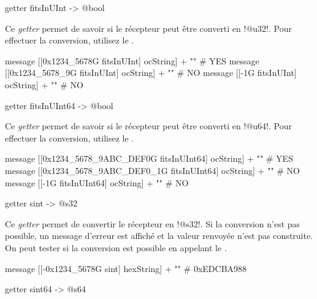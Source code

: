 
\begin{galgas4box}
getter fitsInUInt -> @bool
\end{galgas4box}

Ce \emph{getter} permet de savoir si le récepteur peut être converti en \ggsq!@u32!. Pour effectuer la conversion, utilisez le .

\begin{galgas4}
message [[0x1234_5678G fitsInUInt] ocString] + "\n" # YES
message [[0x1234_5678_9G fitsInUInt] ocString] + "\n" # NO
message [[-1G fitsInUInt] ocString] + "\n" # NO
\end{galgas4}







\begin{galgas4box}
getter fitsInUInt64 -> @bool
\end{galgas4box}

Ce \emph{getter} permet de savoir si le récepteur peut être converti en \ggsq!@u64!. Pour effectuer la conversion, utilisez le .

\begin{galgas4}
message [[0x1234_5678_9ABC_DEF0G fitsInUInt64] ocString] + "\n" # YES
message [[0x1234_5678_9ABC_DEF0_1G fitsInUInt64] ocString] + "\n" # NO
message [[-1G fitsInUInt64] ocString] + "\n" # NO
\end{galgas4}



\begin{galgas4box}
getter sint -> @s32
\end{galgas4box}

Ce \emph{getter} permet de convertir le récepteur en \ggsq!@s32!. Si la conversion n'est pas possible, un message d'erreur est affiché et la valeur renvoyée n'est pas construite. On peut tester si la conversion est possible en appelant le .

\begin{galgas4}
message [[-0x1234_5678G sint] hexString] + "\n" # 0xEDCBA988
\end{galgas4}





\begin{galgas4box}
getter sint64 -> @s64
\end{galgas4box}

